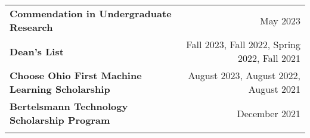 \documentclass[letterpaper,8pt]{article} %
\begin{document}
\begin{tabular*}{\linewidth}{@{\extracolsep{\fill}} lr }
\textbf{Commendation in Undergraduate Research} & May 2023\\
\textbf{Dean's List} & Fall 2023, Fall 2022, Spring 2022, Fall 2021\\
\textbf{Choose Ohio First Machine Learning Scholarship} & August 2023, August 2022, August 2021\\
\textbf{Bertelsmann Technology Scholarship Program} & December 2021\\
\multicolumn{2}{p{\linewidth}}{}
\end{tabular*}
\end{document}
